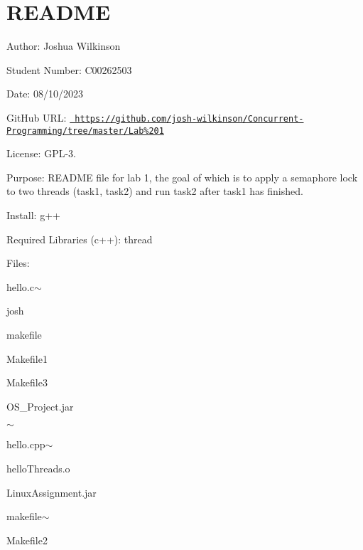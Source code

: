 \chapter{README}
\hypertarget{md__r_e_a_d_m_e}{}\label{md__r_e_a_d_m_e}
\label{md__r_e_a_d_m_e_autotoc_md0}%
%
 Author\+: Joshua Wilkinson

Student Number\+: C00262503

Date\+: 08/10/2023

Git\+Hub URL\+: \href{https://github.com/josh-wilkinson/Concurrent-Programming/tree/master/Lab\%201}{\texttt{ https\+://github.\+com/josh-\/wilkinson/\+Concurrent-\/\+Programming/tree/master/\+Lab\%201}}

License\+: GPL-\/3.

Purpose\+: README file for lab 1, the goal of which is to apply a semaphore lock to two threads (task1, task2) and run task2 after task1 has finished.

Install\+: g++

Required Libraries (c++)\+: thread

Files\+:
\begin{DoxyItemize}
\item hello.\+c\texorpdfstring{$\sim$}{\string~}
\item {}
\item josh
\item makefile
\item Makefile1
\item Makefile3
\item OS\+\_\+\+Project.\+jar
\item {}\texorpdfstring{$\sim$}{\string~}
\item {}
\item hello.\+cpp\texorpdfstring{$\sim$}{\string~}
\item hello\+Threads.\+o
\item Linux\+Assignment.\+jar
\item makefile\texorpdfstring{$\sim$}{\string~}
\item Makefile2
\item {}
\item {}
\item {} 
\end{DoxyItemize}